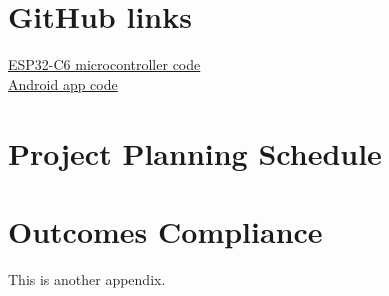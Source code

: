 \chapter{GitHub links}
\makeatletter{}\makeatother
\label{appen:derivations_bigramseg}

\href{https://github.com/22546723/skripsie_esp32_code}{ESP32-C6 microcontroller code} \\
\href{https://github.com/22546723/skripsie_android_app}{Android app code}

\chapter{Project Planning Schedule}
\makeatletter{}\makeatother
\label{appen:derivations_bigramseg}



\chapter{Outcomes Compliance}
\makeatletter{}\makeatother
\label{appen:derivations_bigramseg}

This is another appendix.
